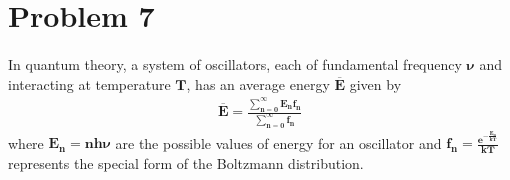 \documentclass[]{article}
\begin{document}
{		
	\section*{Problem 7}

		\paragraph{} In quantum theory, a system of oscillators, each of fundamental frequency $\bm{\nu}$ and interacting at temperature $\bm{T}$, has an average energy $\bm{\overline{E}}$ given by
			\begin{equation*}
				\begin{split}
					\bm{\overline{E} =  \frac{ \sum\limits_{n=0}^{\infty} E_n f_n }{ \sum\limits_{n=0}^{\infty} f_n }}
				\end{split}
			\end{equation*}
		where $\bm{ E_n = nh\nu }$ are the possible values of energy for an oscillator and $\bm{ f_n = \frac{ e^{-\frac{E_n}{kT}} }{ kT } }$ represents the special form of the Boltzmann distribution.
		
}
\end{document}
